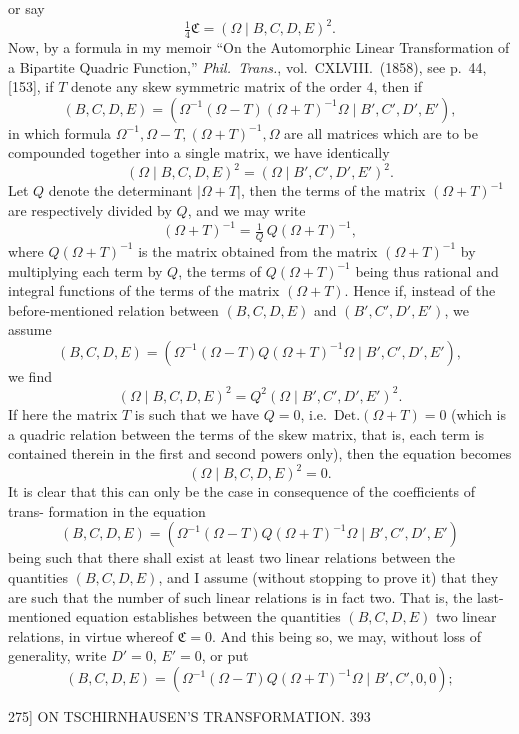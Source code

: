 \documentclass[11pt]{article}
\begin{document}
or say
\[ \tfrac{1}{4}\mathfrak{C}=(\Omega \mid B,C,D,E)^{2}. \]
Now, by a formula in my memoir ``On the Automorphic Linear Transformation of a
Bipartite Quadric Function,'' \emph{Phil.~Trans.}, vol.~CXLVIII.\ (1858), see p.~44, [153], if $T$
denote any skew symmetric matrix of the order $4$, then if
\[ (B,C,D,E)=(\Omega^{-1}(\Omega-T)(\Omega+T)^{-1}\Omega \mid B',C',D',E'), \]
in which formula $\Omega^{-1},\Omega-T,(\Omega+T)^{-1},\Omega$ are all matrices which are to be
compounded together into a single matrix, we have identically
\[ (\Omega \mid B,C,D,E)^{2}=(\Omega \mid B',C',D',E')^{2}. \]
Let $Q$ denote the determinant $\lvert\Omega+T\rvert$, then the terms of the matrix
$(\Omega+T)^{-1}$ are respectively divided by $Q$, and we may write
\[ (\Omega+T)^{-1}=\tfrac{1}{Q}\,Q(\Omega+T)^{-1}, \]
where $Q(\Omega+T)^{-1}$ is the matrix obtained from the matrix $(\Omega+T)^{-1}$ by
multiplying each term by $Q$, the terms of $Q(\Omega+T)^{-1}$ being thus rational and
integral functions of the terms of the matrix $(\Omega+T)$. Hence if, instead of the
before-mentioned relation between $(B,C,D,E)$ and $(B',C',D',E')$, we assume
\[ (B,C,D,E)=(\Omega^{-1}(\Omega-T)Q(\Omega+T)^{-1}\Omega \mid B',C',D',E'), \]
we find
\[ (\Omega \mid B,C,D,E)^{2}=Q^{2}(\Omega \mid B',C',D',E')^{2}. \]
If here the matrix $T$ is such that we have $Q=0$, i.e.\ $\mathrm{Det.}(\Omega+T)=0$ (which
is a quadric relation between the terms of the skew matrix, that is, each term is
contained therein in the first and second powers only), then the equation becomes
\[ (\Omega \mid B,C,D,E)^{2}=0. \]
It is clear that this can only be the case in consequence of the coefficients of trans-
formation in the equation
\[ (B,C,D,E)=(\Omega^{-1}(\Omega-T)Q(\Omega+T)^{-1}\Omega \mid B',C',D',E') \]
being such that there shall exist at least two linear relations between the quantities
$(B,C,D,E)$, and I assume (without stopping to prove it) that they are such that
the number of such linear relations is in fact two. That is, the last-mentioned
equation establishes between the quantities $(B,C,D,E)$ two linear relations, in virtue
whereof $\mathfrak{C}=0$. And this being so, we may, without loss of generality, write
$D'=0$, $E'=0$, or put
\[ (B,C,D,E)=(\Omega^{-1}(\Omega-T)Q(\Omega+T)^{-1}\Omega \mid B',C',0,0); \]

\begin{center}
\textsc{275]} \hfill ON TSCHIRNHAUSEN'S TRANSFORMATION. \hfill 393
\end{center}
\end{document}
